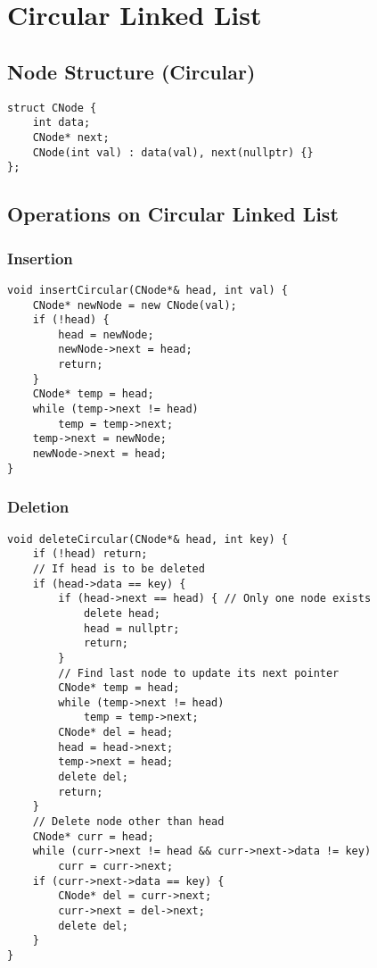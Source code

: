 \newpage

\section{Circular Linked List}

\subsection{Node Structure (Circular)}
\begin{lstlisting}[style=cppstyle, caption={Circular Linked List Node Structure in C++}]
struct CNode {
    int data;
    CNode* next;
    CNode(int val) : data(val), next(nullptr) {}
};
\end{lstlisting}

\subsection{Operations on Circular Linked List}
\subsubsection{Insertion}
\begin{lstlisting}[style=cppstyle, caption={Insert in Circular Linked List}]
void insertCircular(CNode*& head, int val) {
    CNode* newNode = new CNode(val);
    if (!head) {
        head = newNode;
        newNode->next = head;
        return;
    }
    CNode* temp = head;
    while (temp->next != head)
        temp = temp->next;
    temp->next = newNode;
    newNode->next = head;
}
\end{lstlisting}

\subsubsection{Deletion}
\begin{lstlisting}[style=cppstyle, caption={Delete Node in Circular Linked List}]
void deleteCircular(CNode*& head, int key) {
    if (!head) return;
    // If head is to be deleted
    if (head->data == key) {
        if (head->next == head) { // Only one node exists
            delete head;
            head = nullptr;
            return;
        }
        // Find last node to update its next pointer
        CNode* temp = head;
        while (temp->next != head)
            temp = temp->next;
        CNode* del = head;
        head = head->next;
        temp->next = head;
        delete del;
        return;
    }
    // Delete node other than head
    CNode* curr = head;
    while (curr->next != head && curr->next->data != key)
        curr = curr->next;
    if (curr->next->data == key) {
        CNode* del = curr->next;
        curr->next = del->next;
        delete del;
    }
}
\end{lstlisting}

